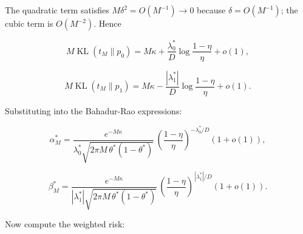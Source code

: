 \documentclass[12pt]{article}
\begin{document}
The quadratic term satisfies \(M\delta^2 = O(M^{-1})\to 0\) because
\(\delta = O(M^{-1})\); the cubic term is \(O(M^{-2})\). Hence

\[
M\operatorname{KL}(t_M\|p_0) = M\kappa + \frac{\lambda_0^*}{D}\log\frac{1-\eta}{\eta} + o(1),
\]

\[
M\operatorname{KL}(t_M\|p_1) = M\kappa - \frac{|\lambda_1^*|}{D}\log\frac{1-\eta}{\eta} + o(1).
\]

Substituting into the Bahadur-Rao expressions:

\[
\alpha_M^* = \frac{e^{-M\kappa}}
{\lambda_0^*\sqrt{2\pi M\,\theta^*(1-\theta^*)}}\,
\left(\frac{1-\eta}{\eta}\right)^{-\lambda_0^*/D}
(1+o(1)),
\]

\[
\beta_M^* = \frac{e^{-M\kappa}}
{|\lambda_1^*|\sqrt{2\pi M\,\theta^*(1-\theta^*)}}\,
\left(\frac{1-\eta}{\eta}\right)^{\,|\lambda_1^*|/D}
(1+o(1)).
\]

Now compute the weighted risk:
\end{document}
